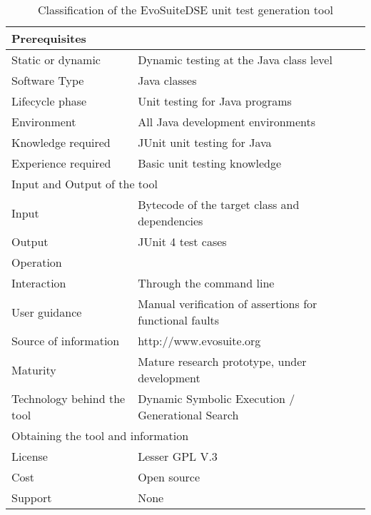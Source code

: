 \documentclass[conference]{IEEEtran}
\begin{document}
\begin{table}[!ht]
\renewcommand{\arraystretch}{1.3}
\caption{Classification of the EvoSuiteDSE unit test generation tool}
\label{table_example}
\centering
\begin{tabular}{|l|p{130px}|}
    \hline
    \multicolumn{2}{|l|}{Prerequisites}\\
    \hline
    Static or dynamic & Dynamic testing at the Java class level \\
    Software Type & Java classes\\
    Lifecycle phase & Unit testing for Java programs\\
    Environment & All Java development environments\\
    Knowledge required & JUnit unit testing for Java\\
    Experience required & Basic unit testing knowledge\\
    \hline
    \multicolumn{2}{|l|}{Input and Output of the tool}\\
    \hline
    Input & Bytecode of the target class and dependencies\\
    Output & JUnit 4 test cases\\
    \hline
    \multicolumn{2}{|l|}{Operation}\\
    \hline
    Interaction & Through the command line\\
    User guidance & Manual verification of assertions for functional faults\\
    Source of information & http://www.evosuite.org\\
    Maturity & Mature research prototype, under development\\
    Technology behind the tool & Dynamic Symbolic Execution / Generational Search\\
    \hline
    \multicolumn{2}{|l|}{Obtaining the tool and information}\\
    \hline
    License & Lesser GPL V.3\\
    Cost & Open source\\
    Support & None\\
    \hline
\end{tabular}
\end{table}
\end{document}
